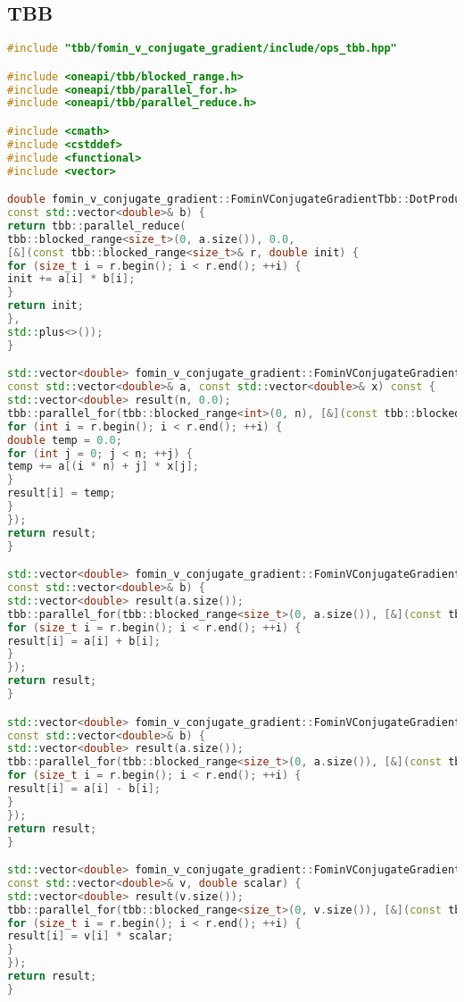 \documentclass[12pt]{article}
\begin{document}
\subsection*{TBB}
\begin{lstlisting}[language=C++]
#include "tbb/fomin_v_conjugate_gradient/include/ops_tbb.hpp"

#include <oneapi/tbb/blocked_range.h>
#include <oneapi/tbb/parallel_for.h>
#include <oneapi/tbb/parallel_reduce.h>

#include <cmath>
#include <cstddef>
#include <functional>
#include <vector>

double fomin_v_conjugate_gradient::FominVConjugateGradientTbb::DotProduct(const std::vector<double>& a,
const std::vector<double>& b) {
return tbb::parallel_reduce(
tbb::blocked_range<size_t>(0, a.size()), 0.0,
[&](const tbb::blocked_range<size_t>& r, double init) {
for (size_t i = r.begin(); i < r.end(); ++i) {
init += a[i] * b[i];
}
return init;
},
std::plus<>());
}

std::vector<double> fomin_v_conjugate_gradient::FominVConjugateGradientTbb::MatrixVectorMultiply(
const std::vector<double>& a, const std::vector<double>& x) const {
std::vector<double> result(n, 0.0);
tbb::parallel_for(tbb::blocked_range<int>(0, n), [&](const tbb::blocked_range<int>& r) {
for (int i = r.begin(); i < r.end(); ++i) {
double temp = 0.0;
for (int j = 0; j < n; ++j) {
temp += a[(i * n) + j] * x[j];
}
result[i] = temp;
}
});
return result;
}

std::vector<double> fomin_v_conjugate_gradient::FominVConjugateGradientTbb::VectorAdd(const std::vector<double>& a,
const std::vector<double>& b) {
std::vector<double> result(a.size());
tbb::parallel_for(tbb::blocked_range<size_t>(0, a.size()), [&](const tbb::blocked_range<size_t>& r) {
for (size_t i = r.begin(); i < r.end(); ++i) {
result[i] = a[i] + b[i];
}
});
return result;
}

std::vector<double> fomin_v_conjugate_gradient::FominVConjugateGradientTbb::VectorSub(const std::vector<double>& a,
const std::vector<double>& b) {
std::vector<double> result(a.size());
tbb::parallel_for(tbb::blocked_range<size_t>(0, a.size()), [&](const tbb::blocked_range<size_t>& r) {
for (size_t i = r.begin(); i < r.end(); ++i) {
result[i] = a[i] - b[i];
}
});
return result;
}

std::vector<double> fomin_v_conjugate_gradient::FominVConjugateGradientTbb::VectorScalarMultiply(
const std::vector<double>& v, double scalar) {
std::vector<double> result(v.size());
tbb::parallel_for(tbb::blocked_range<size_t>(0, v.size()), [&](const tbb::blocked_range<size_t>& r) {
for (size_t i = r.begin(); i < r.end(); ++i) {
result[i] = v[i] * scalar;
}
});
return result;
}


\end{lstlisting}
\end{document}
